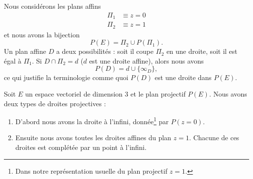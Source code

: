 \begin{example}
    Nous considérons les plans affins
    \begin{subequations}
        \begin{align}
            \Pi_1&\equiv z=0\\
            \Pi_2&\equiv z=1
        \end{align}
    \end{subequations}
    et nous avons la bijection
    \begin{equation}
        P(E)=\Pi_2\cup P(\Pi_1).
    \end{equation}
    Un plan affine \( D\) a deux possibilités : soit il coupe \( \Pi_2\) en une droite, soit il est égal à \( \Pi_1\). Si \( D\cap\Pi_2=d\) (\( d\) est une droite affine), alors nous avons
    \begin{equation}
        P(D)=d\cup\{ \infty_D \},
    \end{equation}
    ce qui justifie la terminologie comme quoi \( P(D)\) est une droite dans \( P(E)\).
\end{example}

Soit \( E\) un espace vectoriel de dimension \( 3\) et le plan projectif \( P(E)\). Nous avons deux types de droites projectives :
\begin{enumerate}
    \item
        D'abord nous avons la droite à l'infini, donnée\footnote{Dans notre représentation usuelle du plan projectif \( z=1\).} par \( P(z=0)\).
    \item
        Ensuite nous avons toutes les droites affines du plan \( z=1\). Chacune de ces droites est complétée par un point à l'infini. 
\end{enumerate}

